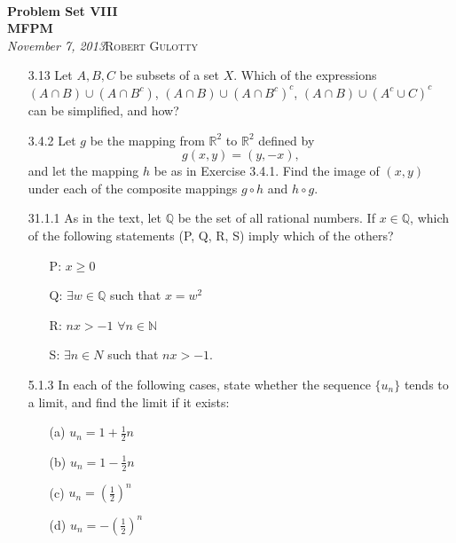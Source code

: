 \documentclass[12pt]{article}
\begin{document}
{\noindent\Huge\bf  \\[0.5\baselineskip] {\selectfont  Problem Set VIII}         }\\[2\baselineskip] %
{ {\bf {}\selectfont MFPM}\\ {\textit{\selectfont     November 7, 2013}}}\hfill   {\large \textsc{Robert Gulotty}} %
\\[1.4\baselineskip] 




\begin{itemize}

\item[3.13] Let $A, B, C$ be subsets of a set $X$.  Which of the expressions $(A\cap B)\cup (A\cap B^c)$, $(A\cap B)\cup (A\cap B^c)^c$, $(A\cap B)\cup (A^c\cup C)^c$ can be simplified, and how?



\item[3.4.2] Let $g$ be the mapping from $\mathbb{R}^2$ to $\mathbb{R}^2$ defined by $$g(x, y)=(y, -x),$$ and let the mapping $h$ be as in Exercise 3.4.1.  Find the image of $(x, y)$ under each of the composite mappings $g\circ h$ and $h\circ g$.


\item[31.1.1] As in the text, let $\mathbb{Q}$ be the set of all rational numbers. If $x\in \mathbb{Q}$, which of the following statements (P, Q, R, S) imply which of the others?

\begin{itemize}

\item[P:] $x\geq 0$
\item[Q:] $\exists w\in \mathbb{Q} $ such that $x=w^2$
\item[R:] $nx>-1$ $\forall n\in \mathbb{N}$
\item[S:] $\exists n\in N$ such that $nx>-1$.

\end{itemize}

\item[5.1.3] In each of the following cases, state whether the sequence $\{u_n\}$ tends to a limit, and find the limit if it exists:

\begin{itemize}
\item[(a)] $u_n=1+\frac{1}{2}n$
\item[(b)] $u_n=1-\frac{1}{2}n$
\item[(c)] $u_n=(\frac{1}{2})^n$
\item[(d)] $u_n=-(\frac{1}{2})^n$
\end{itemize}

\end{itemize}
\end{document}

